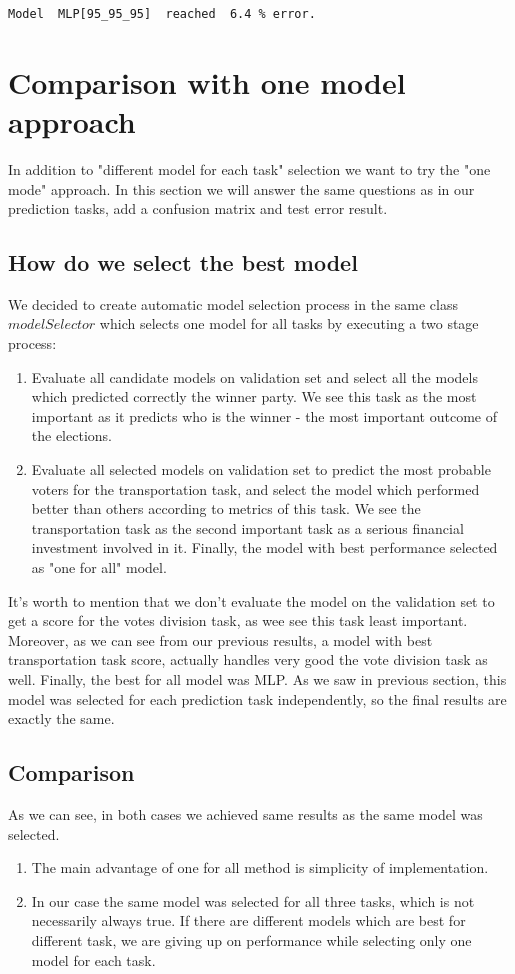 \documentclass[12pt]{article}
\begin{document}
\begin{verbatim}
Model  MLP[95_95_95]  reached  6.4 % error.
\end{verbatim}

\newpage
\section{Comparison with one model approach}
In addition to "different model for each task" selection we want to try the "one mode" approach. In this section we will answer the same questions as in our prediction tasks, add a confusion matrix and test error result.
\subsection{How do we select the best model}
We decided to create automatic model selection process in the same class $modelSelector$ which selects one model for all tasks by executing a two stage process:
\begin{enumerate}
\item Evaluate all candidate models on validation set and select all the models which predicted correctly the winner party. We see this task as the most important as it predicts who is the winner - the most important outcome of the elections.
\item Evaluate all selected models on validation set to predict the most probable voters for the transportation task, and select the model which performed better than others according to metrics of this task. We see the transportation task as the second important task as a serious financial investment involved in it. Finally, the model with best performance selected as "one for all" model. 
\end{enumerate}
It's worth to mention that we don't evaluate the model on the validation set to get a score for the votes division task, as wee see this task least important. Moreover, as we can see from our previous results, a model with best transportation task score, actually handles very good the vote division task as well. Finally, the best for all model was MLP. As we saw in previous section, this model was selected for each prediction task independently, so the final results are exactly the same.  

\subsection{Comparison}
As we can see, in both cases we achieved same results as the same model was selected.
\begin{enumerate}
\item The main advantage of one for all method is simplicity of implementation.
\item In our case the same model was selected for all three tasks, which is not necessarily always true. If there are different models which are best for different task, we are giving up on performance while selecting only one model for each task.
\end{enumerate}
\end{document}
